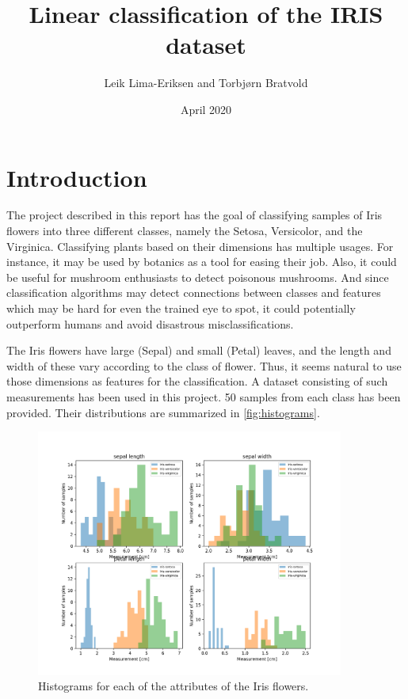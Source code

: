 \documentclass{article}
\begin{document}
\title{Linear classification of the IRIS dataset}
\author{Leik Lima-Eriksen and Torbjørn Bratvold}
\date{April 2020}

\maketitle
\newpage

\tableofcontents
\newpage

\section{Introduction}\label{sec:introduction}
The project described in this report has the goal of classifying samples of Iris flowers into
three different classes, namely the Setosa, Versicolor, and the Virginica. Classifying plants
based on their dimensions has multiple usages. For instance, it may be used by botanics as a tool
for easing their job. Also, it could be useful for mushroom enthusiasts to detect poisonous
mushrooms. And since classification algorithms may detect connections between classes and features
which may be hard for even the trained eye to spot, it could potentially outperform humans and
avoid disastrous misclassifications.

The Iris flowers have large (Sepal) and small (Petal) leaves, and the length and width of these
vary according to the class of flower. Thus, it seems natural to use those dimensions as features
for the classification. A dataset consisting of such measurements has been used in this project. 50
samples from each class has been provided. Their distributions are summarized in \autoref{fig:histograms}.

\begin{figure}[h]
    \centering
    \includegraphics[width=0.9\textwidth]{../images/iris_histograms.png}
    \caption{Histograms for each of the attributes of the Iris flowers.}
    \label{fig:histograms}
\end{figure}
\end{document}
